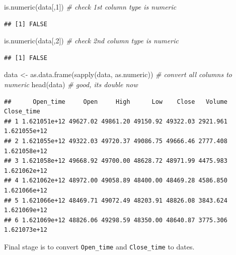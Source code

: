 \documentclass[
]{book}
\newenvironment{Shaded}{\begin{snugshade}}{\end{snugshade}}
\newcommand{\CommentTok}[1]{\textcolor[rgb]{0.56,0.35,0.01}{\textit{#1}}}
\newcommand{\DecValTok}[1]{\textcolor[rgb]{0.00,0.00,0.81}{#1}}
\newcommand{\FunctionTok}[1]{\textcolor[rgb]{0.00,0.00,0.00}{#1}}
\newcommand{\NormalTok}[1]{#1}
\newcommand{\OtherTok}[1]{\textcolor[rgb]{0.56,0.35,0.01}{#1}}
\begin{document}
\begin{Shaded}
\begin{Highlighting}[]
\FunctionTok{is.numeric}\NormalTok{(data[,}\DecValTok{1}\NormalTok{]) }\CommentTok{\# check 1st column type is numeric}
\end{Highlighting}
\end{Shaded}

\begin{verbatim}
## [1] FALSE
\end{verbatim}

\begin{Shaded}
\begin{Highlighting}[]
\FunctionTok{is.numeric}\NormalTok{(data[,}\DecValTok{2}\NormalTok{]) }\CommentTok{\# check 2nd column type is numeric}
\end{Highlighting}
\end{Shaded}

\begin{verbatim}
## [1] FALSE
\end{verbatim}

\begin{Shaded}
\begin{Highlighting}[]
\NormalTok{data }\OtherTok{\textless{}{-}} \FunctionTok{as.data.frame}\NormalTok{(}\FunctionTok{sapply}\NormalTok{(data, as.numeric)) }\CommentTok{\# convert all columns to numeric}
\FunctionTok{head}\NormalTok{(data) }\CommentTok{\# good, its double now}
\end{Highlighting}
\end{Shaded}

\begin{verbatim}
##      Open_time     Open     High      Low    Close   Volume   Close_time
## 1 1.621051e+12 49627.02 49861.20 49150.92 49322.03 2921.961 1.621055e+12
## 2 1.621055e+12 49322.03 49720.37 49086.75 49666.46 2777.408 1.621058e+12
## 3 1.621058e+12 49668.92 49700.00 48628.72 48971.99 4475.983 1.621062e+12
## 4 1.621062e+12 48972.00 49058.89 48400.00 48469.28 4586.850 1.621066e+12
## 5 1.621066e+12 48469.71 49072.49 48203.91 48826.08 3843.624 1.621069e+12
## 6 1.621069e+12 48826.06 49298.59 48350.00 48640.87 3775.306 1.621073e+12
\end{verbatim}

Final stage is to convert \texttt{Open\_time} and \texttt{Close\_time} to dates.
\end{document}
